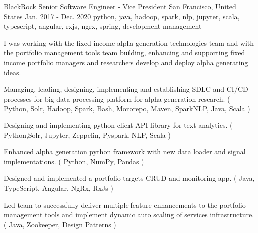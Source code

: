 \cventry
    {BlackRock} %
    {Senior Software Engineer - Vice President} %
    {San Francisco, United States} %
    {Jan. 2017 - Dec. 2020} %
    { python, java, hadoop, spark, nlp, jupyter, scala, typescript, angular, rxjs, ngrx, spring, development management} %
    {
        I was working with the fixed income alpha generation technologies team and with the portfolio management tools team building,
        enhancing and supporting fixed income portfolio managers and researchers develop and deploy alpha generating ideas.
    \begin{cvitems} %
        \item { Managing, leading, designing, implementing and establishing SDLC and CI/CD processes for big data processing platform for alpha generation research. ( Python, Solr, Hadoop, Spark, Bash, Monorepo, Maven, SparkNLP, Java, Scala ) }
        \item { Designing and implementing python client API library for text analytics. ( Python,Solr, Jupyter, Zeppelin, Pyspark, NLP, Scala )}
        \item { Enhanced alpha generation python framework with new data loader and signal implementations. ( Python, NumPy, Pandas )}
        \item { Designed and implemented a portfolio targets CRUD and monitoring app. ( Java, TypeScript, Angular, NgRx, RxJs ) }
        \item { Led team to successfully deliver multiple feature enhancements to the portfolio management tools and implement dynamic auto scaling of services
        infrastructure. ( Java, Zookeeper, Design Patterns )}
    \end{cvitems}
    }






